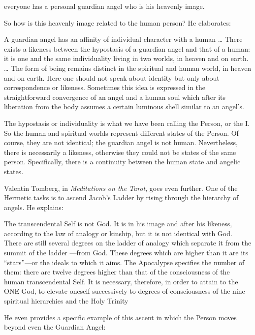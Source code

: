 \begin{quotex}
everyone has a personal guardian angel who is his heavenly image.

\end{quotex}
So how is this heavenly image related to the human person? He elaborates:

\begin{quotex}
A guardian angel has an affinity of individual character with a human … There exists a likeness between the hypostasis of a guardian angel and that of a human: it is one and the same individuality living in two worlds, in heaven and on earth. … The form of being remains distinct in the spiritual and human world, in heaven and on earth. Here one should not speak about identity but only about correspondence or likeness. Sometimes this idea is expressed in the straightforward convergence of an angel and a human soul which after its liberation from the body assumes a certain luminous shell similar to an angel's. 

\end{quotex}
The hypostasis or individuality is what we have been calling the Person, or the I. So the human and spiritual worlds represent different states of the Person. Of course, they are not identical; the guardian angel is not human. Nevertheless, there is necessarily a likeness, otherwise they could not be states of the same person. Specifically, there is a continuity between the human state and angelic states.

Valentin Tomberg, in \emph{Meditations on the Tarot}, goes even further. One of the Hermetic tasks is to ascend Jacob's Ladder by rising through the hierarchy of angels. He explains:

\begin{quotex}
The transcendental Self is not God. It is in his image and after his likeness, according to the law of analogy or kinship, but it is not identical with God. There are still several degrees on the ladder of analogy which separate it from the summit of the ladder —from God. These degrees which are higher than it are its “stars”—or the ideals to which it aims. The Apocalypse specifies the number of them: there are twelve degrees higher than that of the consciousness of the human transcendental Self. It is necessary, therefore, in order to attain to the ONE God, to elevate oneself successively to degrees of consciousness of the nine spiritual hierarchies and the Holy Trinity

\end{quotex}
He even provides a specific example of this ascent in which the Person moves beyond even the Guardian Angel:

